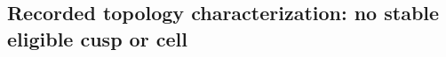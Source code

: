 %
%
\subsection{Recorded topology characterization: no stable eligible cusp or cell}
\label{sec:topology-char-v1}

